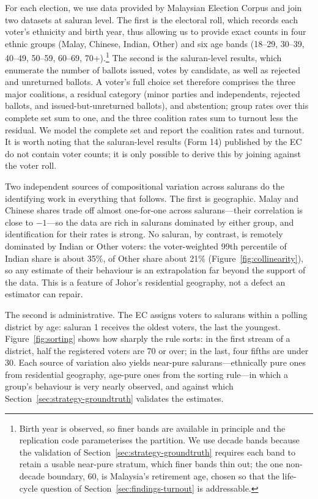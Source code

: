 \documentclass[11pt]{article}
\begin{document}
For each election, we use data provided by Malaysian Election Corpus \cite{meco1} and join two datasets at saluran level. The first is the electoral roll, which records each voter's ethnicity and birth year, thus allowing us to provide exact counts in four ethnic groups (Malay, Chinese, Indian, Other) and six age bands (18--29, 30--39, 40--49, 50--59, 60--69, 70+).\footnote{Birth year is observed, so finer bands are available in principle and the replication code parameterises the partition. We use decade bands because the validation of Section~\ref{sec:strategy-groundtruth} requires each band to retain a usable near-pure stratum, which finer bands thin out; the one non-decade boundary, 60, is Malaysia's retirement age, chosen so that the life-cycle question of Section~\ref{sec:findings-turnout} is addressable.} The second is the saluran-level results, which enumerate the number of ballots issued, votes by candidate, as well as rejected and unreturned ballots. A voter's full choice set therefore comprises the three major coalitions, a residual category (minor parties and independents, rejected ballots, and issued-but-unreturned ballots), and abstention; group rates over this complete set sum to one, and the three coalition rates sum to turnout less the residual. We model the complete set and report the coalition rates and turnout. It is worth noting that the saluran-level results (Form 14) published by the EC do not contain voter counts; it is only possible to derive this by joining against the voter roll.

Two independent sources of compositional variation across salurans do the identifying work in everything that follows. The first is geographic. Malay and Chinese shares trade off almost one-for-one across salurans---their correlation is close to $-1$---so the data are rich in salurans dominated by either group, and identification for their rates is strong. No saluran, by contrast, is remotely dominated by Indian or Other voters: the voter-weighted 99th percentile of Indian share is about 35\%, of Other share about 21\% (Figure~\ref{fig:collinearity}), so any estimate of their behaviour is an extrapolation far beyond the support of the data. This is a feature of Johor's residential geography, not a defect an estimator can repair.

The second is administrative. The EC assigns voters to salurans within a polling district by age: saluran 1 receives the oldest voters, the last the youngest. Figure~\ref{fig:sorting} shows how sharply the rule sorts: in the first stream of a district, half the registered voters are 70 or over; in the last, four fifths are under 30. Each source of variation also yields near-pure salurans---ethnically pure ones from residential geography, age-pure ones from the sorting rule---in which a group's behaviour is very nearly observed, and against which Section~\ref{sec:strategy-groundtruth} validates the estimates.
\end{document}
